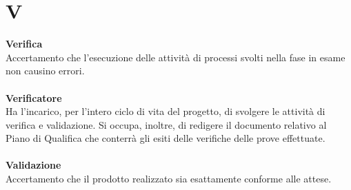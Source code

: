 \section{V}
\textbf{Verifica}\\
Accertamento che l’esecuzione delle attività di processi svolti nella fase in esame non causino errori. \\ \\
\textbf{Verificatore}\\
Ha l'incarico, per l'intero ciclo di vita del progetto, di svolgere le attività di verifica e validazione. Si occupa, inoltre, di redigere il documento relativo al Piano di Qualifica che conterrà gli esiti delle verifiche delle prove effettuate. \\ \\
\textbf{Validazione}\\
Accertamento che il prodotto realizzato sia esattamente conforme alle attese. \\ \\

\clearpage